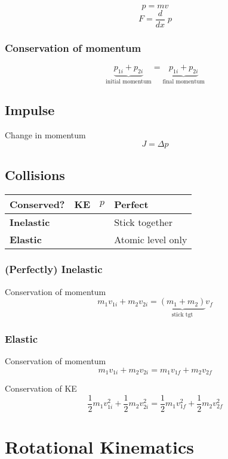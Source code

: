 \documentclass[12pt, twocolumn]{article}
\newcommand{\tick}{\ding{52}}
\newcommand{\cross}{\ding{54}}
\begin{document}
\begin{spacing}{1.5}
$$p = mv$$
$$F = \frac{d}{dx} \; p$$

\subsubsection{Conservation of momentum}

$$\underbrace{p_{1i} + p_{2i}}_{\text{initial momentum}} = \underbrace{p_{1i} + p_{2i}}_{\text{final momentum}}$$

\subsection{Impulse}

Change in momentum
$$J = \Delta p$$

\subsection{Collisions}

\begin{tabular}{l | cc | l}
	\textbf{Conserved?} & \textbf{KE} & \textbf{$p$}& \textbf{Perfect} \\
	\hline
	\textbf{Inelastic} & \cross & \tick & Stick together \\
	\textbf{Elastic} & \tick & \tick & Atomic level only \\
\end{tabular}

\subsubsection{(Perfectly) Inelastic}

Conservation of momentum
$$m_1 v_{1i} + m_2 v_{2i} = \underbrace{(m_1 + m_2)}_{\text{stick tgt}} v_f$$

\subsubsection{Elastic}

Conservation of momentum
$$m_1 v_{1i} + m_2 v_{2i} = m_1 v_{1f} + m_2 v_{2f}$$

Conservation of KE
$$\frac{1}{2} m_1 v_{1i}^2 + \frac{1}{2} m_2 v_{2i}^2 = \frac{1}{2} m_1 v_{1f}^2 + \frac{1}{2} m_2 v_{2f}^2$$

\section{Rotational Kinematics}


\end{spacing}
\end{document}
